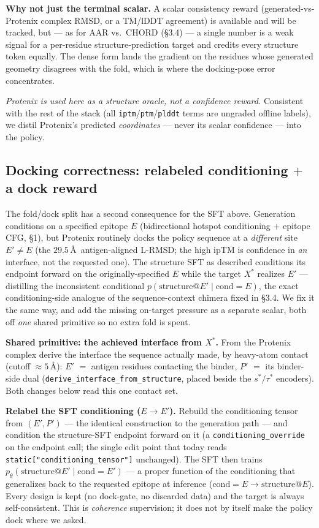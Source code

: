 \documentclass[11pt]{article}
\newcommand{\ttk}[1]{\texttt{\small #1}}
\begin{document}
\textbf{Why not just the terminal scalar.} A scalar consistency reward (generated-vs-Protenix
complex RMSD, or a TM/lDDT agreement) is available and will be tracked, but --- as for AAR vs.\ CHORD
(\S3.4) --- a single number is a weak signal for a per-residue structure-prediction target and
credits every structure token equally. The dense form lands the gradient on the residues whose
generated geometry disagrees with the fold, which is where the docking-pose error concentrates.

\emph{Protenix is used here as a structure oracle, not a confidence reward.} Consistent with the
rest of the stack (all \ttk{iptm}/\ttk{ptm}/\ttk{plddt} terms are ungraded offline labels), we
distil Protenix's predicted \emph{coordinates} --- never its scalar confidence --- into the policy.

\subsection{Docking correctness: relabeled conditioning $+$ a dock reward}
\label{sec:dock}
The fold/dock split has a second consequence for the SFT above. Generation conditions on a specified
epitope $E$ (bidirectional hotspot conditioning $+$ epitope CFG, \S1), but Protenix routinely docks
the policy sequence at a \emph{different} site $E'\!\neq\!E$ (the $29.5$\,\AA\ antigen-aligned
L-RMSD; the high ipTM is confidence in \emph{an} interface, not the requested one). The structure SFT
as described conditions its endpoint forward on the originally-specified $E$ while the target
$X^{\ast}$ realizes $E'$ --- distilling the inconsistent conditional $p(\text{structure}@E'\mid
\text{cond}{=}E)$, the exact conditioning-side analogue of the sequence-context chimera fixed in
\S3.4. We fix it the same way, and add the missing on-target pressure as a separate scalar, both off
\emph{one} shared primitive so no extra fold is spent.

\textbf{Shared primitive: the achieved interface from $X^{\ast}$.} From the Protenix complex derive
the interface the sequence actually made, by heavy-atom contact (cutoff $\approx\!5$\,\AA):
$E'$ $=$ antigen residues contacting the binder, $P'$ $=$ its binder-side dual
(\ttk{derive\_interface\_from\_structure}, placed beside the $s^{\ast}/\tau^{\ast}$ encoders). Both
changes below read this one contact set.

\textbf{Relabel the SFT conditioning ($E\!\to\!E'$).} Rebuild the conditioning tensor from
$(E',P')$ --- the identical construction to the generation path --- and condition the structure-SFT
endpoint forward on it (a \ttk{conditioning\_override} on the endpoint call; the single edit point
that today reads \ttk{static["conditioning\_tensor"]} unchanged). The SFT then trains
$p_\theta(\text{structure}@E'\mid\text{cond}{=}E')$ --- a proper function of the conditioning that
generalizes back to the requested epitope at inference ($\text{cond}{=}E\!\to\!\text{structure}@E$).
Every design is kept (no dock-gate, no discarded data) and the target is always self-consistent. This
is \emph{coherence} supervision; it does not by itself make the policy dock where we asked.
\end{document}
